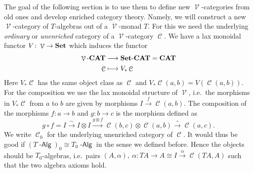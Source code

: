 \documentclass[a4paper,11pt,oneside,openany]{scrbook}
\newcommand{\catname}[1]{{\normalfont\textbf{#1}}}
\DeclareMathOperator{\Alg}{-\mathsf{Alg}}
\newcommand{\Set}{\catname{Set}}
\newcommand{\CAT}{\catname{CAT}}
\DeclareMathOperator{\V}{\mathcal{V}}
\DeclareMathOperator{\C}{\mathcal{C}}
\theoremstyle{definition}
\theoremstyle{definition}
\begin{document}
The goal of the following section is to use them to define new $\V$-categories from old ones and develop enriched category theory. Namely, we will construct a new $\V$-category of $T$-algebras out of a $\V$-monad $T$. For this we need the underlying \emph{ordinary} or \emph{unenriched} category of a $\V$-category $\C$. We have a lax monoidal functor $V\colon\V\to\Set$ which induces the functor
\begin{align*}
    \V\mbox{-}\CAT&\longrightarrow\Set\mbox{-}\CAT=\CAT\\
    \C&\longmapsto V_*\C
\end{align*}
Here $V_*\C$ has the same object class as $\C$ and $V_*\C(a,b)=V(\C(a,b))$. For the composition we use the lax monoidal structure of $\V$, i.e.\ the morphisms in $V_*\C$ from $a$ to $b$ are given by morphisms $I\xrightarrow{f}\C(a,b)$. The composition of the morphisms $f\colon a\to b$ and $g\colon b\to c$ is the morphism defined as
$$g\circ f = I\xrightarrow{\sim} I\otimes I\xrightarrow{g\otimes f}\C(b,c)\otimes\C(a,b)\xrightarrow{\circ}\C(a,c).$$
We write $\C_0$ for the underlying unenriched category of $\C$. It would thus be good if $(T\Alg)_0\cong T_0\Alg$ in the sense we defined before. Hence the objects should be $T_0$-algebras, i.e.\ pairs $(A,\alpha), \ \alpha\colon TA\to A\cong I\xrightarrow{\alpha}\C(TA,A)$ such that the two algebra axioms hold.
\end{document}
